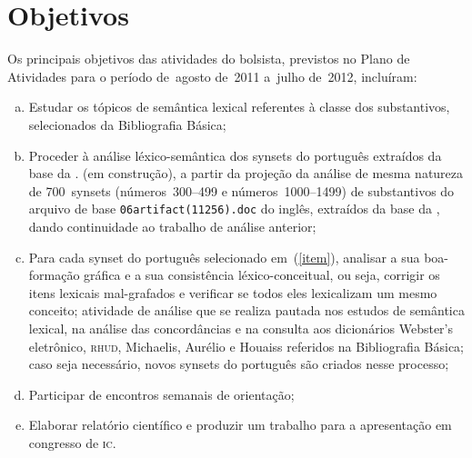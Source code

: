 \chapter{Objetivos}

Os principais objetivos das atividades do bolsista, previstos no Plano de
Atividades para o período de~agosto de~2011 a~julho de~2012, incluíram:

\begin{enumerate}[a.] \item Estudar os tópicos de semântica lexical referentes
      à classe dos substantivos, selecionados da Bibliografia Básica;

  \item\label{item} Proceder à análise léxico-semântica dos synsets do
    português extraídos da base da \wnbr. (em construção), a partir da projeção
    da análise de mesma natureza de 700~synsets (números~300--499 e
    números~1000--1499) de substantivos do arquivo de base
    \texttt{06artifact(11256).doc} do inglês, extraídos da base da \wnpr, dando
    continuidade ao trabalho de análise anterior;

  \item Para cada synset do português selecionado em~(\ref{item}), analisar a
    sua boa-formação gráfica e a sua consistência léxico-conceitual, ou seja,
    corrigir os itens lexicais mal-grafados e verificar se todos eles
    lexicalizam um mesmo conceito; atividade de análise que se realiza pautada
    nos estudos de semântica lexical, na análise das concordâncias e na
    consulta aos dicionários Webster's eletrônico, \textsc{rhud}, Michaelis,
    Aurélio e Houaiss referidos na Bibliografia Básica; caso seja necessário,
    novos synsets do português são criados nesse processo;

  \item Participar de encontros semanais de orientação;

  \item Elaborar relatório científico e produzir um trabalho para a
    apresentação em congresso de \textsc{ic}.
\end{enumerate}

